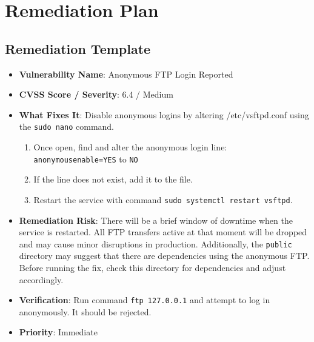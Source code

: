 \documentclass[12pt]{article}
\begin{document}
\section{Remediation Plan}

\subsection{Remediation Template}
\begin{itemize}
    \item \textbf{Vulnerability Name}: Anonymous FTP Login Reported
    \item \textbf{CVSS Score / Severity}: 6.4 / Medium
    \item \textbf{What Fixes It}: Disable anonymous logins by altering /etc/vsftpd.conf using the \texttt{sudo nano} command. 
        \begin{enumerate}
            \item Once open, find and alter the anonymous login line: \texttt{anonymous\underbar{   }enable=YES} to \texttt{NO} 
            \item If the line does not exist, add it to the file. 
            \item Restart the service with command \texttt{sudo systemctl restart vsftpd}.
        \end{enumerate}
    \item \textbf{Remediation Risk}: There will be a brief window of downtime when the service is restarted. All FTP transfers active at that moment will be dropped and may cause minor disruptions in production. Additionally, the \texttt{public} directory may suggest that there are dependencies using the anonymous FTP. Before running the fix, check this directory for dependencies and adjust accordingly.
    \item \textbf{Verification}: Run command \texttt{ftp 127.0.0.1} and attempt to log in anonymously. It should be rejected.
    \item \textbf{Priority}: Immediate
\end{itemize}
\newpage
\end{document}
